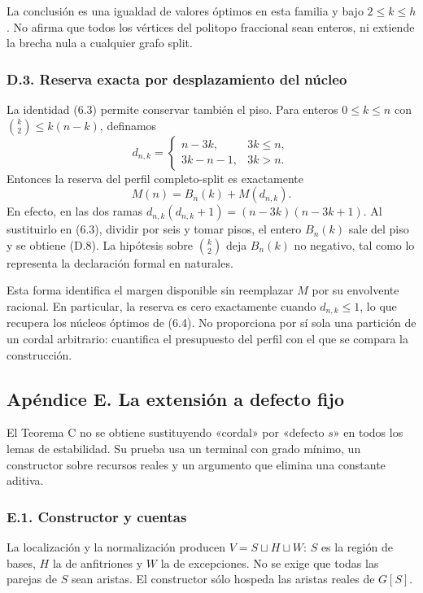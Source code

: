\documentclass[spanish,11pt,a4paper]{article}
\begin{document}
La conclusión es una igualdad de valores óptimos en esta familia y bajo \(2\le k\le h\). No afirma que todos los vértices del politopo fraccional sean enteros, ni extiende la brecha nula a cualquier grafo split.

\subsubsection{D.3. Reserva exacta por desplazamiento del núcleo}\label{d.3.-reserva-exacta-por-desplazamiento-del-nucleo}

La identidad (6.3) permite conservar también el piso. Para enteros \(0\le k\le n\) con \(\binom k2\le k(n-k)\), definamos \[
d_{n,k}=\begin{cases}n-3k,&3k\le n,\\3k-n-1,&3k>n.\end{cases}
\] Entonces la reserva del perfil completo-split es exactamente \[
M(n)=B_n(k)+M(d_{n,k}).
\tag{D.8}
\] En efecto, en las dos ramas \(d_{n,k}(d_{n,k}+1)=(n-3k)(n-3k+1)\). Al sustituirlo en (6.3), dividir por seis y tomar pisos, el entero \(B_n(k)\) sale del piso y se obtiene (D.8). La hipótesis sobre \(\binom k2\) deja \(B_n(k)\) no negativo, tal como lo representa la declaración formal en naturales.

Esta forma identifica el margen disponible sin reemplazar \(M\) por su envolvente racional. En particular, la reserva es cero exactamente cuando \(d_{n,k}\le1\), lo que recupera los núcleos óptimos de (6.4). No proporciona por sí sola una partición de un cordal arbitrario: cuantifica el presupuesto del perfil con el que se compara la construcción.

\subsection{Apéndice E. La extensión a defecto fijo}\label{apendice-e.-la-extension-a-defecto-fijo}

El Teorema C no se obtiene sustituyendo «cordal» por «defecto \(s\)» en todos los lemas de estabilidad. Su prueba usa un terminal con grado mínimo, un constructor sobre recursos reales y un argumento que elimina una constante aditiva.

\subsubsection{E.1. Constructor y cuentas}\label{e.1.-constructor-y-cuentas}

La localización y la normalización producen \(V=S\sqcup H\sqcup W\): \(S\) es la región de bases, \(H\) la de anfitriones y \(W\) la de excepciones. No se exige que todas las parejas de \(S\) sean aristas. El constructor sólo hospeda las aristas reales de \(G[S]\).
\end{document}
